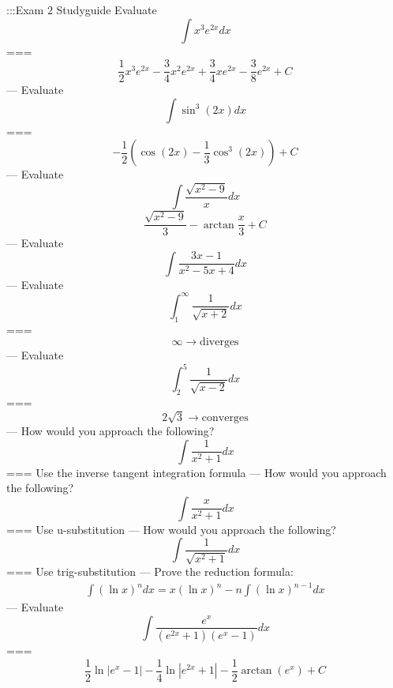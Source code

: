 :::Exam 2 Studyguide
Evaluate
\[\int x^3 e^{2x}dx\]
===
\[\frac{1}{2}x^3e^{2x}-\frac{3}{4}x^2e^{2x}+\frac{3}{4}xe^{2x}-\frac{3}{8}e^{2x}+C\]
---
Evaluate
\[\int\sin^3(2x)dx\]
===
\[-\frac{1}{2}\left(\cos(2x)-\frac{1}{3}\cos^3(2x)\right)+C\]
---
Evaluate
\[\int\frac{\sqrt{x^2-9}}{x}dx\]
\[\frac{\sqrt{x^2-9}}{3}-\arctan\frac{x}{3}+C\]
---
Evaluate
\[\int\frac{3x-1}{x^2-5x+4}dx\]
---
Evaluate
\[\int_1^\infty\frac{1}{\sqrt{x+2}}dx\]
===
\[\infty\rightarrow\text{diverges}\]
---
Evaluate
\[\int_2^5\frac{1}{\sqrt{x-2}}dx\]
===
\[2\sqrt{3}\rightarrow\text{converges}\]
---
How would you approach the following?
\[\int\frac{1}{x^2+1}dx\]
===
Use the inverse tangent integration formula
---
How would you approach the following?
\[\int\frac{x}{x^2+1}dx\]
===
Use u-substitution
---
How would you approach the following?
\[\int\frac{1}{\sqrt{x^2+1}}dx\]
===
Use trig-substitution
---
Prove the reduction formula:
\begin{gather*}
\int(\ln x)^n dx=x(\ln x)^n-n\int(\ln x)^{n-1}dx
\end{gather*}
---
Evaluate
\[\int\frac{e^x}{(e^{2x}+1)(e^x-1)}dx\]
===
\[\frac{1}{2}\ln|e^x-1|-\frac{1}{4}\ln|e^{2x}+1|-\frac{1}{2}\arctan\left(e^x\right)+C\]

